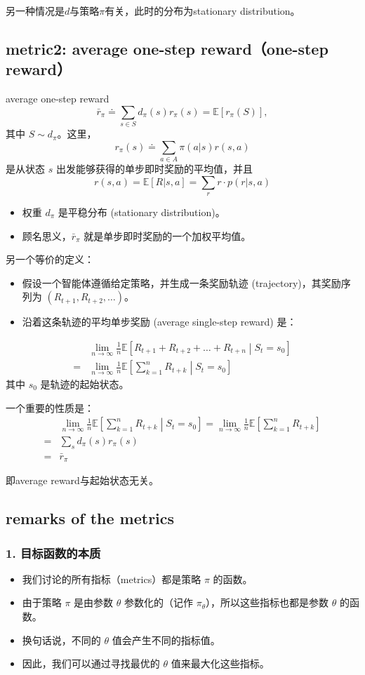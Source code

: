 \documentclass{article}
\begin{document}
另一种情况是$d$与策略$\pi$有关，此时的分布为stationary distribution。
\subsection{metric2: average one-step reward（one-step reward）}
average one-step reward
\[
\bar{r}_{\pi} \doteq \sum_{s \in S} d_{\pi}(s) r_{\pi}(s) = \mathbb{E}[r_{\pi}(S)],
\]
其中 $S \sim d_{\pi}$。这里，
\[
r_{\pi}(s) \doteq \sum_{a \in A} \pi(a|s) r(s, a)
\]
是从状态 $s$ 出发能够获得的单步即时奖励的平均值，并且
\[
r(s, a) = \mathbb{E}[R|s, a] = \sum_{r} r \cdot p(r|s, a)
\]

\begin{itemize}
    \item 权重 $d_{\pi}$ 是平稳分布 (stationary distribution)。
    \item 顾名思义，$\bar{r}_{\pi}$ 就是单步即时奖励的一个加权平均值。
\end{itemize}
另一个等价的定义：
\begin{itemize}
    \item 假设一个智能体遵循给定策略，并生成一条奖励轨迹 (trajectory)，其奖励序列为 $(R_{t+1}, R_{t+2}, \dots)$。
    
    \item 沿着这条轨迹的平均单步奖励 (average single-step reward) 是：
\end{itemize}
\begin{align*}
    &\lim_{n \to \infty} \frac{1}{n} \mathbb{E}\left[R_{t+1} + R_{t+2} + \dots + R_{t+n} \middle| S_t=s_0\right] \\
    ={}& \lim_{n \to \infty} \frac{1}{n} \mathbb{E}\left[\sum_{k=1}^{n} R_{t+k} \middle| S_t=s_0\right]
\end{align*}
其中 $s_0$ 是轨迹的起始状态。

一个重要的性质是：
\begin{align*}
    &\lim_{n \to \infty} \frac{1}{n} \mathbb{E}\left[\sum_{k=1}^{n} R_{t+k} \middle| S_t=s_0\right] = \lim_{n \to \infty} \frac{1}{n} \mathbb{E}\left[\sum_{k=1}^{n} R_{t+k}\right] \\
    ={}& \sum_{s} d_{\pi}(s) r_{\pi}(s) \\
    ={}& \bar{r}_{\pi}
\end{align*}

即average reward与起始状态无关。
\subsection{remarks of the metrics}
\subsubsection*{1. 目标函数的本质}
\begin{itemize}
    \item 我们讨论的所有指标（metrics）都是策略 $\pi$ 的函数。
    \item 由于策略 $\pi$ 是由参数 $\theta$ 参数化的（记作 $\pi_{\theta}$），所以这些指标也都是参数 $\theta$ 的函数。
    \item 换句话说，不同的 $\theta$ 值会产生不同的指标值。
    \item 因此，我们可以通过寻找最优的 $\theta$ 值来最大化这些指标。
\end{itemize}
\end{document}
